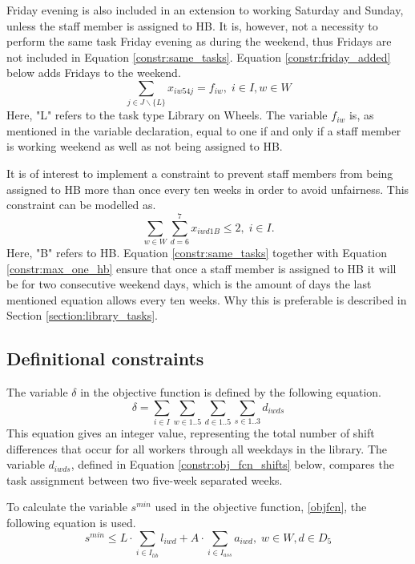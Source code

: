 Friday evening is also included in an extension to working Saturday and Sunday, unless the staff member is assigned to HB. It is, however, not a necessity to perform the same task Friday evening as during the weekend, thus Fridays are not included in Equation \ref{constr:same_tasks}. Equation \ref{constr:friday_added} below adds Fridays to the weekend.
\begin{equation} \label{constr:friday_added}
\sum_{j \in J \backslash \{L\}}x_{iw54j} = f_{iw}, \;   i \in I, w \in W
\end{equation}
Here, "L" refers to the task type Library on Wheels. The variable $f_{iw}$ is, as mentioned in the variable declaration, equal to one if and only if a staff member is working weekend as well as not being assigned to HB.

It is of interest to implement a constraint to prevent staff members from being assigned to HB more than once every ten weeks in order to avoid unfairness. This constraint can be modelled as.
\begin{equation} \label{constr:max_one_hb}
\sum_{w \in W}\sum_{d = 6}^{7}x_{iwd1B} \leq 2, \;   i \in I.
\end{equation}
Here, "B" refers to HB. Equation \ref{constr:same_tasks} together with Equation \ref{constr:max_one_hb} ensure that once a staff member is assigned to HB it will be for two consecutive weekend days, which is the amount of days the last mentioned equation allows every ten weeks. Why this is preferable is described in Section \ref{section:library_tasks}.

\subsection{Definitional constraints} \label{section:obj_fcn_constraints}
The variable $\delta$ in the objective function is defined by the following equation.
\begin{equation} \label{constr:delta}
\delta = \sum_{i \in I} \sum_{w \in 1..5} \sum_{d \in 1..5} \sum_{s \in 1..3} d_{iwds}
\end{equation}
This equation gives an integer value, representing the total number of shift differences that occur for all workers through all weekdays in the library. The variable $d_{iwds}$, defined in Equation \ref{constr:obj_fcn_shifts} below, compares the task assignment between two five-week separated weeks.

To calculate the variable $s^{min}$ used in the objective function, \ref{objfcn}, the following equation is used.
\begin{equation} \label{constr:s_min}
s^{min} \leq L\cdot \sum_{i \in I_{lib}} l_{iwd} + A\cdot \sum_{i \in I_{ass}} a_{iwd}, \;   w \in W, d \in D_5
\end{equation}

